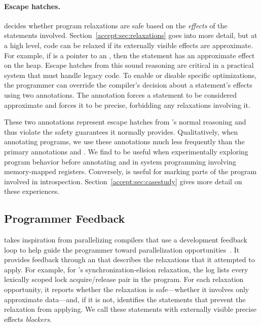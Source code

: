 \paragraph{Escape hatches.}
\sysname decides whether program relaxations are safe based on the
\emph{effects} of the statements involved. Section~\ref{accept:sec:relaxations} goes
into more detail, but at a high level, code can be relaxed if its externally
visible effects are approximate.  For example, if  is a pointer to
an , then the statement  has an approximate effect
on the heap.
Escape hatches from this sound reasoning are critical in a practical
system that must handle legacy code.
To enable or disable specific optimizations, the programmer can
override the compiler's decision about a statement's effects using two
annotations. The \annpermit annotation forces a statement to
be considered approximate
and \annforbid forces it to be precise, forbidding
any relaxations involving it.

These two annotations represent escape hatches from \sysname's normal
reasoning and thus violate the safety guarantees it normally provides.
%
Qualitatively, when annotating programs, we use these
annotations much less frequently than the primary annotations
 and . We find \annpermit to be
useful when experimentally exploring program behavior before annotating and in
system programming involving memory-mapped registers.  Conversely,
\annforbid is useful for marking parts of the program involved in
introspection. Section~\ref{accept:sec:casestudy} gives more detail on these
experiences.

\subsection{Programmer Feedback}
\label{accept:sec:feedback}

\sysname takes inspiration from parallelizing compilers that use a development
feedback loop to help guide the programmer toward parallelization
opportunities~\cite{canal, deditor}.
It provides
feedback through an  that describes the relaxations that it
attempted to apply. For example, for \sysname's synchronization-elision
relaxation, the log lists every lexically scoped lock acquire/release pair in
the program. For each relaxation opportunity, it reports whether the relaxation
is safe---whether it involves only approximate data---and, if it is
not, identifies the statements that prevent the relaxation from applying.
We call these statements with
externally visible precise effects \emph{blockers}.

